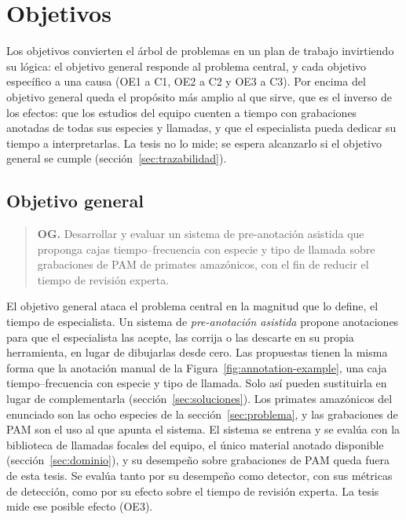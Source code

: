 \section{Objetivos}
\label{sec:objetivos}

Los objetivos convierten el árbol de problemas en un plan de trabajo invirtiendo
su lógica: el objetivo general responde al problema central, y cada objetivo
específico a una causa (OE1 a C1, OE2 a C2 y OE3 a C3). Por encima del objetivo
general queda el propósito más amplio al que sirve, que es el inverso de los
efectos: que los
estudios del equipo cuenten a tiempo con grabaciones anotadas de todas sus
especies y llamadas, y que el especialista pueda dedicar su tiempo a
interpretarlas. La tesis no lo mide; se espera alcanzarlo si el objetivo general
se cumple (sección~\ref{sec:trazabilidad}).

\subsection{Objetivo general}

\begin{quote}
    \textbf{OG.} Desarrollar y evaluar un sistema de pre-anotación asistida que
    proponga cajas tiempo--frecuencia con especie y tipo de llamada sobre
    grabaciones de PAM de primates amazónicos, con el fin de reducir el tiempo de
    revisión experta.
\end{quote}

El objetivo general ataca el problema central en la magnitud que lo define, el
tiempo de especialista. Un sistema de \emph{pre-anotación asistida} propone
anotaciones para que el especialista las acepte, las corrija o las descarte en su
propia herramienta, en lugar de dibujarlas desde cero. Las propuestas tienen la
misma forma que la anotación manual de la Figura~\ref{fig:annotation-example},
una caja tiempo--frecuencia con especie y tipo de llamada. Solo así pueden
sustituirla en lugar de complementarla (sección~\ref{sec:soluciones}). Los
primates amazónicos del enunciado son las ocho especies de la
sección~\ref{sec:problema}, y las grabaciones de PAM son el uso al que apunta el
sistema. El sistema se entrena y se evalúa con la biblioteca de llamadas focales
del equipo, el único material anotado disponible (sección~\ref{sec:dominio}), y
su desempeño sobre grabaciones de PAM queda fuera de esta tesis. Se evalúa tanto
por su desempeño como detector, con sus métricas de detección, como por su efecto
sobre el tiempo de revisión experta. La tesis mide ese posible efecto (OE3).

